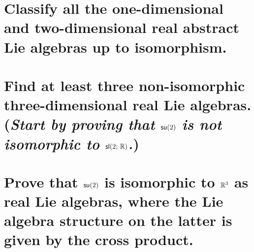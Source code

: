 \documentclass[
	pages,
	boxes,
	color=WildStrawberry
]{homework}
\begin{document}
\begin{problem}
\begin{parts}
	\part{Classify all the one-dimensional and two-dimensional real abstract Lie algebras up to isomorphism.}\label{part:2a}
	\part{Find at least three non-isomorphic three-dimensional real Lie algebras. (\textit{Start by proving that $\mathsf{su}(2)$ is not isomorphic to $\mathsf{sl}(2;\, \mathbb{R})$.})}\label{part:2b}
	\part{Prove that $\mathsf{su}(2)$ is isomorphic to $\mathbb{R}^3$ as real Lie algebras, where the Lie algebra structure on the latter is given by the cross product.}\label{part:2c}
\end{parts}
\end{problem}
\end{document}
